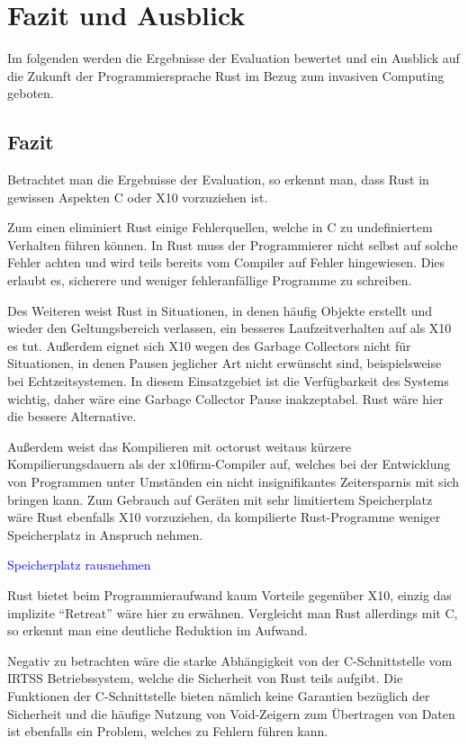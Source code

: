 \chapter{Fazit und Ausblick}\label{sec:conclusion}

Im folgenden werden die Ergebnisse der Evaluation bewertet
und ein Ausblick auf die Zukunft der Programmiersprache Rust im Bezug zum invasiven Computing geboten.

\section{Fazit}

Betrachtet man die Ergebnisse der Evaluation, so erkennt man,
dass Rust in gewissen Aspekten C oder X10 vorzuziehen ist.

Zum einen eliminiert Rust einige Fehlerquellen, welche in C zu undefiniertem Verhalten führen können.
In Rust muss der Programmierer nicht selbst auf solche Fehler achten und wird teils bereits vom Compiler auf Fehler
hingewiesen. Dies erlaubt es, sicherere und weniger fehleranfällige Programme zu schreiben.

Des Weiteren weist Rust in Situationen, in denen häufig Objekte erstellt und wieder den Geltungsbereich verlassen,
ein besseres Laufzeitverhalten auf als X10 es tut. Außerdem eignet sich X10 wegen des Garbage Collectors nicht für 
Situationen, in denen Pausen jeglicher Art nicht erwünscht sind, beispielsweise bei Echtzeitsystemen. In diesem
Einsatzgebiet ist die Verfügbarkeit des Systems wichtig, daher wäre eine Garbage Collector Pause inakzeptabel.
Rust wäre hier die bessere Alternative.

Außerdem weist das Kompilieren mit octorust weitaus kürzere Kompilierungsdauern als der x10firm-Compiler auf,
welches bei der Entwicklung von Programmen unter Umständen ein nicht insignifikantes Zeitersparnis
mit sich bringen kann. 
Zum Gebrauch auf Geräten mit sehr limitiertem Speicherplatz wäre Rust ebenfalls X10 
vorzuziehen, da kompilierte Rust-Programme weniger Speicherplatz in Anspruch nehmen.

\textcolor{blue}{Speicherplatz rausnehmen}

Rust bietet beim Programmieraufwand kaum Vorteile gegenüber X10, einzig das implizite "`Retreat"' wäre hier zu 
erwähnen. Vergleicht man Rust allerdings mit C, so erkennt man eine deutliche Reduktion im Aufwand.

Negativ zu betrachten wäre die starke Abhängigkeit von der C-Schnittstelle vom IRTSS Betriebssystem,
welche die Sicherheit von Rust teils aufgibt. Die Funktionen der C-Schnittstelle bieten nämlich keine Garantien 
bezüglich der Sicherheit und die häufige Nutzung von Void-Zeigern zum Übertragen von Daten ist ebenfalls ein Problem, 
welches zu Fehlern führen kann.

